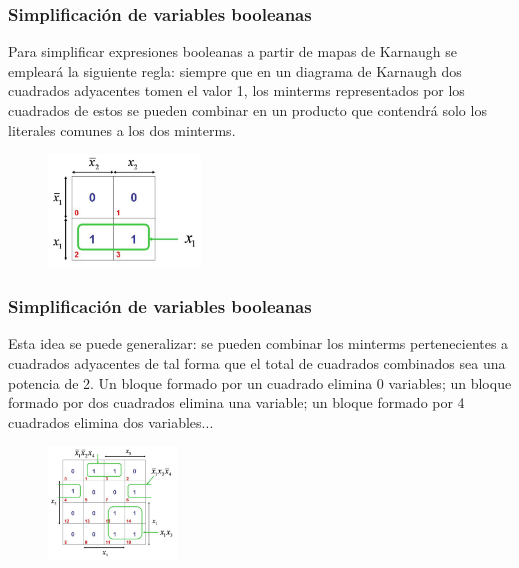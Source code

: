 \documentclass{beamer}
\begin{document}
\begin{frame}
\frametitle{Simplificaci\'on de variables booleanas}
Para simplificar expresiones booleanas a partir de mapas de Karnaugh se emplear\'a la siguiente regla: siempre que en un diagrama de Karnaugh dos cuadrados adyacentes tomen el valor 1, los minterms representados por los cuadrados de estos se pueden combinar en un producto que contendr\'a solo los literales comunes a los dos minterms.


 \begin{figure}[h]
  \label{fig:volumen}
\centering
\includegraphics[height=3cm]{k6}
\end{figure}

\end{frame}





\begin{frame}
\frametitle{Simplificaci\'on de variables booleanas}
Esta idea se puede generalizar: se pueden combinar los minterms pertenecientes a cuadrados adyacentes de tal forma que el total de cuadrados combinados sea una potencia de 2. Un bloque formado por un cuadrado elimina 0 variables; un bloque formado por dos cuadrados elimina una variable; un bloque formado por 4 cuadrados elimina dos variables...

 \begin{figure}[h]
  \label{fig:volumen}
\centering
\includegraphics[height=3cm]{k7}
\end{figure}

\end{frame}
\end{document}
